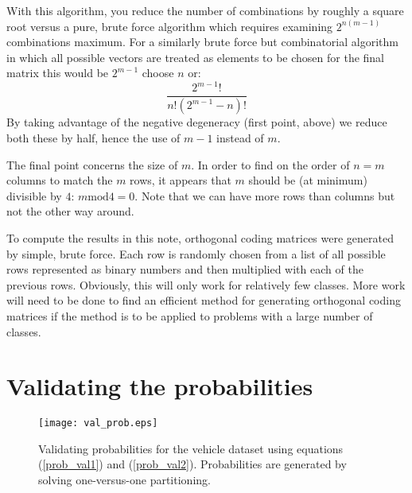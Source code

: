 With this algorithm, you reduce the number of combinations by roughly a square
root versus a pure, brute force algorithm which requires examining $2^{n(m-1)}$
combinations maximum.
For a similarly brute force but combinatorial algorithm 
in which all possible vectors are treated as elements to be chosen for the 
final matrix this would be $2^{m-1}$ choose $n$ or:
\begin{equation}
	\frac{2^{m-1}!}{n!(2^{m-1}-n)!}
\end{equation}
By taking advantage of the negative degeneracy (first point, above) 
we reduce both these by half, hence the use of $m-1$ instead of $m$.

The final point concerns the size of $m$. In order to find on the order
of $n=m$ columns to match the $m$ rows, it appears that $m$ should be 
(at minimum) divisible by $4$: $m \mathrm{mod} 4 = 0$.
Note that we can have more rows than columns but not the other way around.

To compute the results in this note, orthogonal coding matrices were generated
by simple, brute force.
Each row is randomly chosen from a list of all
possible rows represented as binary numbers and then multiplied with 
each of the previous rows.
Obviously, this will only work for relatively few classes.
More work will need to be done to find an efficient method for generating 
orthogonal coding matrices
if the method is to be applied to problems with a large number of classes.

\section{Validating the probabilities}

\begin{figure}
	\texttt{[image: val\_prob.eps]}
	\caption{Validating probabilities for the vehicle dataset
		using equations	(\ref{prob_val1}) and (\ref{prob_val2}).
		Probabilities are generated by solving one-versus-one 
		partitioning.}\label{val_prob}
\end{figure}


